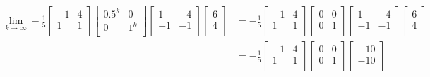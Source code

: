 \documentclass[titlepage]{article}
\begin{document}
\begin{align*}
    \lim_{k\to\infty} -\frac{1}{5}
    \begin{bmatrix}
        -1 & 4\\
        1 & 1\\
    \end{bmatrix}
    \begin{bmatrix}
        0.5^k & 0\\
        0 & 1^k\\
    \end{bmatrix}
    \begin{bmatrix}
        1 & -4\\
        -1 & -1\\
    \end{bmatrix}
    \begin{bmatrix}
        6\\
        4\\
    \end{bmatrix}
    &= -\frac{1}{5}
    \begin{bmatrix}
        -1 & 4\\
        1 & 1\\
    \end{bmatrix}
    \begin{bmatrix}
        0 & 0\\
        0 & 1\\
    \end{bmatrix}
    \begin{bmatrix}
        1 & -4\\
        -1 & -1\\
    \end{bmatrix}
    \begin{bmatrix}
        6\\
        4\\
    \end{bmatrix}\\
    &= -\frac{1}{5}
    \begin{bmatrix}
        -1 & 4\\
        1 & 1\\
    \end{bmatrix}
    \begin{bmatrix}
        0 & 0\\
        0 & 1\\
    \end{bmatrix}
    \begin{bmatrix}
        -10\\
        -10\\

\end{bmatrix}
\end{align*}
\end{document}
